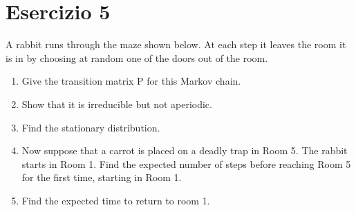 \documentclass[
	12pt, %
]{fphw}
\begin{document}
\section*{Esercizio 5}

\begin{problem}
	\smallskip
	A rabbit runs through the maze shown below. At each step it leaves
	the room it is in by choosing at random one of the doors out of the room.\\
	\begin{enumerate} 
		\item Give the transition matrix P for this Markov chain.\\
		\item Show that it is irreducible but not aperiodic.\\
		\item Find the stationary distribution.\\
		\item Now suppose that a carrot is placed on a deadly trap in Room
		5. The rabbit starts in Room 1. Find the expected number
		of steps before reaching Room 5 for the first time, starting in Room 1.\\
		\item Find the expected time to return to room 1.
	\end{enumerate}
	\smallskip
\end{problem}
\end{document}
